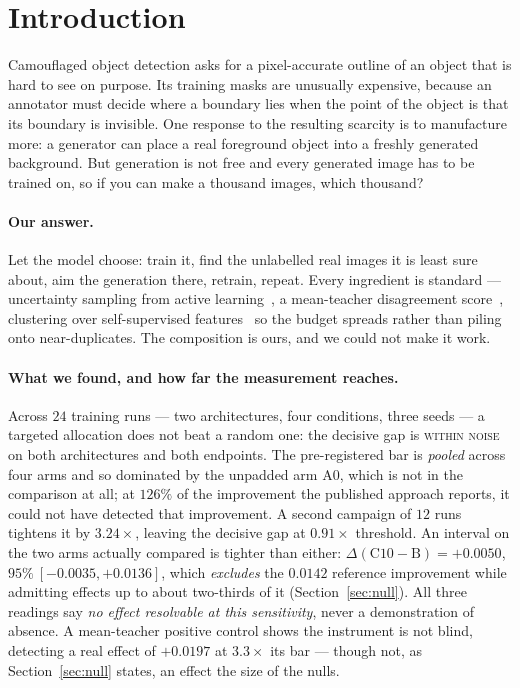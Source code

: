 \documentclass{article} %
\begin{document}
\section{Introduction}
\label{sec:intro}

Camouflaged object detection asks for a pixel-accurate outline of an object that is hard to see on
purpose. Its training masks are unusually expensive, because an annotator must decide where a
boundary lies when the point of the object is that its boundary is invisible. One response to the
resulting scarcity is to manufacture more: a generator can place a real foreground object into a
freshly generated background. But generation is not free and every generated image has to be trained
on, so if you can make a thousand images, which thousand?

\paragraph{Our answer.} Let the model choose: train it, find the unlabelled real images it is least
sure about, aim the generation there, retrain, repeat. Every ingredient is standard --- uncertainty
sampling from active learning~\cite{settles2009active}, a mean-teacher disagreement
score~\cite{tarvainen2017mean}, clustering over self-supervised
features~\cite{oquab2024dinov2,radford2021learning} so the budget spreads rather than piling onto
near-duplicates. The composition is ours, and we could not make it work.

\paragraph{What we found, and how far the measurement reaches.} Across $24$ training runs --- two
architectures, four conditions, three seeds --- a targeted allocation does not beat a random one:
the decisive gap is \textsc{within noise} on both architectures and both endpoints. The
pre-registered bar is \emph{pooled} across four arms and so dominated by the unpadded arm A0, which
is not in the comparison at all; at $126\%$ of the improvement the published approach reports, it
could not have detected that improvement. A second campaign of $12$ runs tightens it by
$3.24\times$, leaving the decisive gap at $0.91\times$ threshold. An interval on the two arms
actually compared is tighter than either: $\Delta(\mathrm{C10}-\mathrm{B}) = +0.0050$, $95\%\
[-0.0035, +0.0136]$, which \emph{excludes} the $0.0142$ reference improvement while admitting
effects up to about two-thirds of it (Section~\ref{sec:null}). All three readings say \emph{no
effect resolvable at this sensitivity}, never a demonstration of absence. A
mean-teacher positive control shows the instrument is not blind, detecting a real effect of
$+0.0197$ at $3.3\times$ its bar --- though not, as Section~\ref{sec:null} states, an effect the size
of the nulls.
\end{document}
